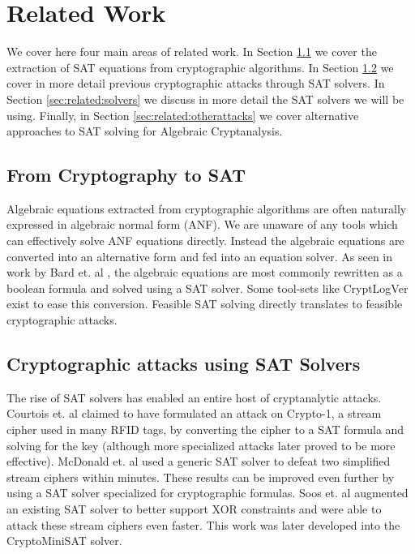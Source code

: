 \section{Related Work}
\label{sec:related}
We cover here four main areas of related work. In Section \ref{sec:related:extraction} we cover the extraction of SAT equations from cryptographic algorithms. In Section \ref{sec:related:satattacks} we cover in more detail previous cryptographic attacks through SAT solvers. In Section \ref{sec:related:solvers} we discuss in more detail the SAT solvers we will be using. Finally, in Section \ref{sec:related:otherattacks} we cover alternative approaches to SAT solving for Algebraic Cryptanalysis. 

\subsection{From Cryptography to SAT}
\label{sec:related:extraction}
Algebraic equations extracted from cryptographic algorithms are often naturally expressed in algebraic normal form (ANF). We are unaware of any tools which can effectively solve ANF equations directly. Instead the algebraic equations are converted into an alternative form and fed into an equation solver. As seen in work by Bard et. al \cite{BCJ07}, the algebraic equations are most commonly rewritten as a boolean formula and solved using a SAT solver. Some tool-sets like CryptLogVer \cite{MS13} exist to ease this conversion. Feasible SAT solving directly translates to feasible cryptographic attacks.

\subsection{Cryptographic attacks using SAT Solvers}
\label{sec:related:satattacks}
The rise of SAT solvers has enabled an entire host of cryptanalytic attacks. Courtois et. al \cite{CNO08} claimed to have formulated an attack on Crypto-1, a stream cipher used in many RFID tags, by converting the cipher to a SAT formula and solving for the key (although more specialized attacks \cite{GGMRVSJ08} later proved to be more effective). McDonald et. al \cite{MCP07} used a generic SAT solver to defeat two simplified stream ciphers within minutes. These results can be improved even further by using a SAT solver specialized for cryptographic formulas. Soos et. al \cite{SNC09} augmented an existing SAT solver to better support XOR constraints and were able to attack these stream ciphers even faster. This work was later developed into the {CryptoMiniSAT} solver.

